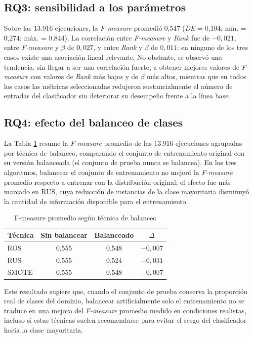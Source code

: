 \documentclass[conference,a4paper]{IEEEtran}
\begin{document}
\subsection{RQ3: sensibilidad a los parámetros}

Sobre las 13.916 ejecuciones, la \textit{F-measure} promedió 0,547 (\textit{DE} = 0,104; mín. = 0,274; máx. = 0,844). La correlación entre \textit{F-measure} y \textit{Rank} fue de $-0{,}021$, entre \textit{F-measure} y $\beta$ de $0{,}027$, y entre \textit{Rank} y $\beta$ de $0{,}011$: en ninguno de los tres casos existe una asociación lineal relevante. No obstante, se observó una tendencia, sin llegar a ser una correlación fuerte, a obtener mejores valores de \textit{F-measure} con valores de \textit{Rank} más bajos y de $\beta$ más altos, mientras que en todos los casos las métricas seleccionadas redujeron sustancialmente el número de entradas del clasificador sin deteriorar su desempeño frente a la línea base.

\subsection{RQ4: efecto del balanceo de clases}
\label{sec:RQ4}

La Tabla \ref{tab:balance} resume la \textit{F-measure} promedio de las 13.916 ejecuciones agrupadas por técnica de balanceo, comparando el conjunto de entrenamiento original con su versión balanceada (el conjunto de prueba nunca se balancea). En los tres algoritmos, balancear el conjunto de entrenamiento no mejoró la \textit{F-measure} promedio respecto a entrenar con la distribución original; el efecto fue más marcado en RUS, cuya reducción de instancias de la clase mayoritaria disminuyó la cantidad de información disponible para el entrenamiento.

\begin{table}[H]
\caption{F-measure promedio según técnica de balanceo}
\label{tab:balance}
\centering
\begin{tabular}{lccc}
\toprule
Técnica & Sin balancear & Balanceado & $\Delta$ \\
\midrule
ROS   & 0,555 & 0,548 & $-0,007$ \\
RUS   & 0,555 & 0,524 & $-0,031$ \\
SMOTE & 0,555 & 0,548 & $-0,007$ \\
\bottomrule
\end{tabular}
\end{table}

Este resultado sugiere que, cuando el conjunto de prueba conserva la proporción real de clases del dominio, balancear artificialmente solo el entrenamiento no se traduce en una mejora del \textit{F-measure} promedio medido en condiciones realistas, incluso si estas técnicas suelen recomendarse para evitar el sesgo del clasificador hacia la clase mayoritaria.
\end{document}
